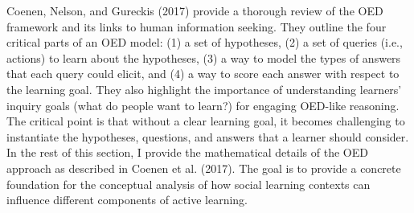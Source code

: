 \documentclass[english,floatsintext,man]{apa6}
\theoremstyle{definition}
\theoremstyle{definition}
\theoremstyle{definition}
\theoremstyle{remark}
\begin{document}

Coenen, Nelson, and Gureckis (2017) provide a thorough review of the OED
framework and its links to human information seeking. They outline the
four critical parts of an OED model: (1) a set of hypotheses, (2) a set
of queries (i.e., actions) to learn about the hypotheses, (3) a way to
model the types of answers that each query could elicit, and (4) a way
to score each answer with respect to the learning goal. They also
highlight the importance of understanding learners' inquiry goals (what
do people want to learn?) for engaging OED-like reasoning. The critical
point is that without a clear learning goal, it becomes challenging to
instantiate the hypotheses, questions, and answers that a learner should
consider. In the rest of this section, I provide the mathematical
details of the OED approach as described in Coenen et al. (2017). The
goal is to provide a concrete foundation for the conceptual analysis of
how social learning contexts can influence different components of
active learning.
\end{document}
